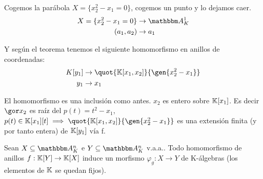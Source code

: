 	\begin{example}
		Cogemos la parábola $X=\{x_2^2-x_1=0\}$, cogemos un punto y lo dejamos caer.
		\begin{align*}
			X=\{x_2^2-x_1=0\} & \rightarrow \A_K^1 \\
			(a_1,a_2) & \rightarrow a_1
		\end{align*}

		Y según el teorema tenemos el siguiente homomorfismo en anillos de coordenadas:
		\begin{align*}
			K[y_1] & \rightarrow \quot{\K[x_1,x_2]}{\gen{x_2^2-x_1}} \\
			y_1 & \rightarrow x_1
		\end{align*}

		El homomorfismo es una inclusión como antes. $x_2$ es entero sobre $\mathbb{K}[x_1]$. Es decir $\cls{x_2}$ es raíz del $p(t)=t^2-x_1$, $p(t)\in \K[x_1][t] \implies \quot{\K[x_1,x_2]}{\gen{x_2^2-x_1}}$ es una extensión finita (y por tanto entera) de $\mathbb{K}[y_1]$ vía f.
	\end{example}

	\begin{prop}
		Sean $X \subseteq \Akn$ e $Y \subseteq \Akn$ v.a.a.. Todo homomorfismo de anillos $f: \mathbb{K}[Y] \rightarrow \mathbb{K}[X]$ induce un morfismo $\varphi_g: X \rightarrow Y$ de K-álgebras (los elementos de $\mathbb{K}$ se quedan fijos).
	\end{prop}

